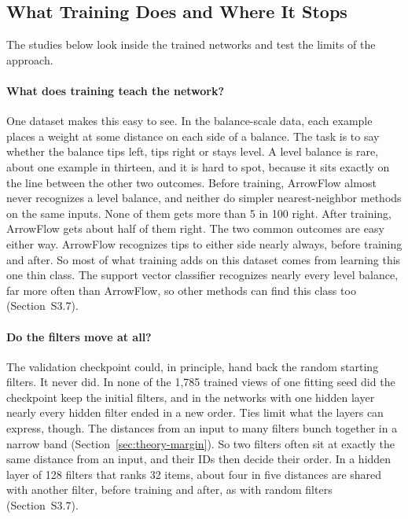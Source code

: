 \subsection{What Training Does and Where It Stops}\label{sec:controlled}

The studies below look inside the trained networks and test the limits of the approach.

\paragraph{What does training teach the network?} One dataset makes this easy to see. In the balance-scale data, each example places a weight at some distance on each side of a balance. The task is to say whether the balance tips left, tips right or stays level. A level balance is rare, about one example in thirteen, and it is hard to spot, because it sits exactly on the line between the other two outcomes. Before training, ArrowFlow almost never recognizes a level balance, and neither do simpler nearest-neighbor methods on the same inputs. None of them gets more than 5 in 100 right. After training, ArrowFlow gets about half of them right. The two common outcomes are easy either way. ArrowFlow recognizes tips to either side nearly always, before training and after. So most of what training adds on this dataset comes from learning this one thin class. The support vector classifier recognizes nearly every level balance, far more often than ArrowFlow, so other methods can find this class too (Section~S3.7).

\paragraph{Do the filters move at all?} The validation checkpoint could, in principle, hand back the random starting filters. It never did. In none of the 1,785 trained views of one fitting seed did the checkpoint keep the initial filters, and in the networks with one hidden layer nearly every hidden filter ended in a new order. Ties limit what the layers can express, though. The distances from an input to many filters bunch together in a narrow band (Section~\ref{sec:theory-margin}). So two filters often sit at exactly the same distance from an input, and their IDs then decide their order. In a hidden layer of 128 filters that ranks 32 items, about four in five distances are shared with another filter, before training and after, as with random filters (Section~S3.7).

